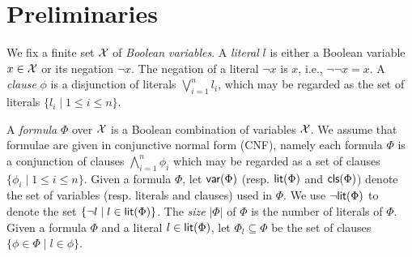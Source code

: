 \section{Preliminaries}\label{sec:prel}

We fix a finite set  $\mathcal{X}$ of \emph{Boolean variables}.
A \emph{literal} $l$ is either a Boolean variable $x\in \mathcal{X}$ or its negation $\neg x$.
The negation of a literal $\neg x$ is $x$, i.e., $\neg\neg x=x$.
A \emph{clause} $\phi$ is a disjunction of literals $\bigvee_{i=1}^n l_i$, which may be regarded as
the set of literals $\{l_i\mid 1\leq i\leq n\}$.

A \emph{formula} $\Phi$ over $\mathcal{X}$ is a Boolean combination of variables $\mathcal{X}$.
We assume that formulae are given in conjunctive normal
form (CNF), namely each formula $\Phi$ is a conjunction of clauses $\bigwedge_{i=1}^n\phi_i$ which may be regarded as a set of clauses $\{\phi_i\mid 1\leq i\leq n\}$.
Given a formula $\Phi$, let $\textsf{var}(\Phi)$ (resp. $\textsf{lit}(\Phi)$  and $\textsf{cls}(\Phi)$) denote the set of variables (resp. literals and clauses) used in $\Phi$.
We use $\neg\textsf{lit}(\Phi)$ to denote the set $\{\neg l \mid l\in \textsf{lit}(\Phi)\}$.
The \emph{size} $|\Phi|$ of $\Phi$ is the number of literals of $\Phi$.
Given a formula $\Phi$ and a literal $l\in\textsf{lit}(\Phi)$,
let $\Phi_{l}\subseteq \Phi$ be the set of clauses $\{\phi\in\Phi\mid l\in\phi\}$.


